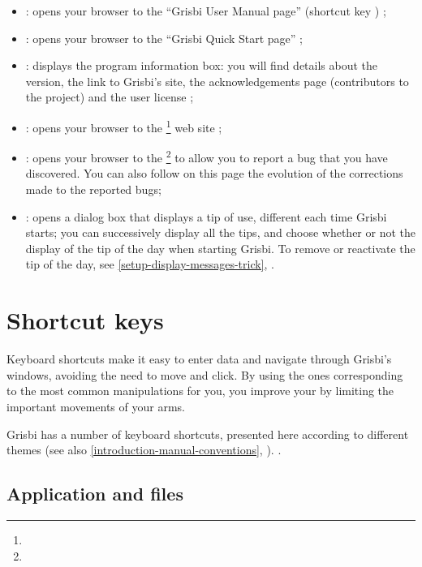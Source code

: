 \begin{itemize}
	\item {} : opens your browser to the  \enquote{Grisbi User Manual page} (shortcut key  ) ;
	\item {} : opens your browser to the  \enquote{Grisbi Quick Start page} ;
	\item {} : displays the program information box: you will find details about the version, the link to Grisbi's site, the acknowledgements page (contributors to the project) and the user license ;
	\item {} : opens your browser to the \footnote{\urlGrisbi{}} web site ;
	\item {} : opens your browser to the \footnote{\urlBugTracker{}} to allow you to report a bug that you have discovered. You can also follow on this page the evolution of the corrections made to the reported bugs;
	\item {} : opens a dialog box that displays a tip of use, different each time Grisbi starts; you can successively display all the tips, and choose whether or not the display of the tip of the day when starting Grisbi. To remove or reactivate the tip of the day, see \vref{setup-display-messages-trick}, .
\end{itemize}


\section{Shortcut keys\label{home-shortcuts}}


Keyboard shortcuts make it easy to enter data and navigate through Grisbi's windows, avoiding the need to move and click. By using the ones corresponding to the most common manipulations for you, you improve your  by limiting the important movements of your arms.
 
Grisbi has a number of keyboard shortcuts, presented here according to different themes (see also  \vref{introduction-manual-conventions}, ).
.

\subsection{Application and files}

